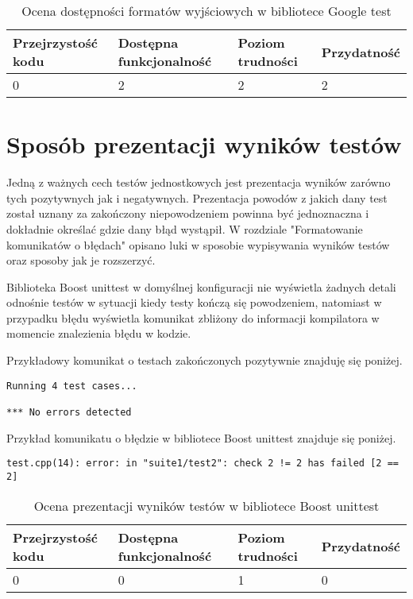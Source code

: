 \documentclass[12pt,a4paper,notitlepage]{report}
\begin{document}
\begin{center}
			\begin{table}[!ht]
			\caption{Ocena dostępności formatów wyjściowych w bibliotece Google test}
			\label{}
			\begin{tabular}[!hc]{|l|l|l|l|}
		\hline
		Przejrzystość kodu 	&	Dostępna funkcjonalność	&	Poziom trudności	&	Przydatność \\ \hline
		0					&	2						&	2					& 	2  			\\ \hline
			\end{tabular}
			\end{table} 
		\end{center}


\chapter{Sposób prezentacji wyników testów}

Jedną z ważnych cech testów jednostkowych jest prezentacja wyników zarówno tych pozytywnych jak i negatywnych. Prezentacja powodów z jakich dany test został uznany za zakończony niepowodzeniem powinna być jednoznaczna i dokładnie określać gdzie dany błąd wystąpił.
W rozdziale "Formatowanie komunikatów o błędach" opisano luki w sposobie wypisywania wyników testów oraz sposoby jak je rozszerzyć.

Biblioteka Boost unittest w domyślnej konfiguracji nie wyświetla żadnych detali odnośnie testów w sytuacji kiedy testy kończą się powodzeniem, natomiast w przypadku błędu wyświetla komunikat zbliżony do informacji kompilatora w momencie znalezienia błędu w kodzie.

Przykładowy komunikat o testach zakończonych pozytywnie znajduję się poniżej.
\begin{lstlisting}[label=some-code,caption=Przykłądowy pozytywny wynik testu w bibliotece Boost unittest]
Running 4 test cases...

*** No errors detected
		\end{lstlisting}

Przykład komunikatu o błędzie w bibliotece Boost unittest znajduje się poniżej.
\begin{lstlisting}[label=some-code,caption=Przykłądowy negatywny wynik testu w bibliotece Boost unittest]
test.cpp(14): error: in "suite1/test2": check 2 != 2 has failed [2 == 2]
		\end{lstlisting}


\begin{center}
			\begin{table}[!ht]
			\caption{Ocena prezentacji wyników testów w bibliotece Boost unittest}
			\label{}
			\begin{tabular}[!hc]{|l|l|l|l|}
		\hline
		Przejrzystość kodu 	&	Dostępna funkcjonalność	&	Poziom trudności	&	Przydatność \\ \hline
		0					&	0						&	1					& 	0  			\\ \hline
			\end{tabular}
			\end{table} 
		\end{center}
\end{document}
